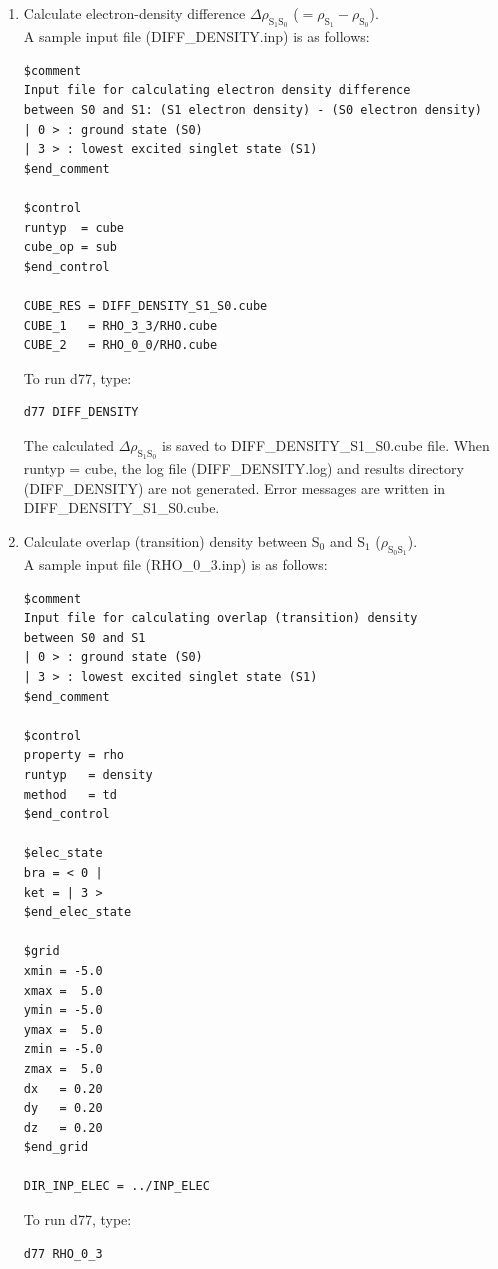 ﻿\documentclass[11pt,a4paper,openany]{article}
\begin{document}
\begin{enumerate}
{\begin{verbatim}
$control
property = rho
runtyp   = density
method   = td
$end_control

$elec_state
bra = < 3 |
ket = | 3 >
$end_elec_state

$grid
xmin = -5.0
xmax =  5.0
ymin = -5.0
ymax =  5.0
zmin = -5.0
zmax =  5.0
dx   = 0.20
dy   = 0.20
dz   = 0.20
$end_grid

DIR_INP_ELEC = ../INP_ELEC
\end{verbatim}
To run d77, type:
\begin{verbatim} 
d77 RHO_3_3
\end{verbatim}
}

\item{
Calculate electron-density difference $\Delta\rho_{\mathrm{S}_1\mathrm{S}_0}$ ($= \rho_{\mathrm{S}_1}-\rho_{\mathrm{S}_0}$).\\
A sample input file (DIFF\_DENSITY.inp) is as follows:
\begin{verbatim}
$comment
Input file for calculating electron density difference
between S0 and S1: (S1 electron density) - (S0 electron density)
| 0 > : ground state (S0)
| 3 > : lowest excited singlet state (S1)
$end_comment

$control
runtyp  = cube
cube_op = sub
$end_control

CUBE_RES = DIFF_DENSITY_S1_S0.cube
CUBE_1   = RHO_3_3/RHO.cube
CUBE_2   = RHO_0_0/RHO.cube
\end{verbatim}
To run d77, type:
\begin{verbatim} 
d77 DIFF_DENSITY
\end{verbatim}
The calculated $\Delta\rho_{\mathrm{S}_1\mathrm{S}_0}$ is saved to DIFF\_DENSITY\_S1\_S0.cube file.
When runtyp = cube, the log file (DIFF\_DENSITY.log) and results directory (DIFF\_DENSITY) are not generated.
Error messages are written in DIFF\_DENSITY\_S1\_S0.cube.
}

\item{
Calculate overlap (transition) density between S$_0$ and S$_1$ ($\rho_{\mathrm{S}_0\mathrm{S}_1}$).\\
A sample input file (RHO\_0\_3.inp) is as follows:
\begin{verbatim}
$comment
Input file for calculating overlap (transition) density
between S0 and S1
| 0 > : ground state (S0)
| 3 > : lowest excited singlet state (S1)
$end_comment

$control
property = rho
runtyp   = density
method   = td
$end_control

$elec_state
bra = < 0 |
ket = | 3 >
$end_elec_state

$grid
xmin = -5.0
xmax =  5.0
ymin = -5.0
ymax =  5.0
zmin = -5.0
zmax =  5.0
dx   = 0.20
dy   = 0.20
dz   = 0.20
$end_grid

DIR_INP_ELEC = ../INP_ELEC
\end{verbatim}
To run d77, type:
\begin{verbatim} 
d77 RHO_0_3
\end{verbatim}
}
\end{enumerate}
\end{document}
